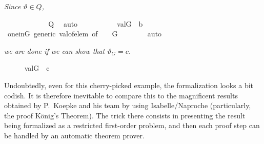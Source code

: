 \textit{Since
  $\vartheta \in Q$,}
\begin{isabelle}
\ \ \ \ \isamarkupfalse%
\isanewline
\ \ \ \ \isamarkupfalse%
\ {\isachardoublequoteopen}{\isacharquery}{\kern0pt}{\isasymtheta}\ {\isasymin}\ {\isacharquery}{\kern0pt}Q{\isachardoublequoteclose}\ \isamarkupfalse%
\ auto\isanewline
\ \ \ \ \isamarkupfalse%
\isanewline
\ \ \ \ \isamarkupfalse%
\ {\isachardoublequoteopen}val{\isacharparenleft}{\kern0pt}G{\isacharcomma}{\kern0pt}{\isacharquery}{\kern0pt}{\isasymtheta}{\isacharparenright}{\kern0pt}\ {\isasymin}\ {\isacharquery}{\kern0pt}b{\isachardoublequoteclose}\isanewline
\ \ \ \ \ \ \isamarkupfalse%
\ one{\isacharunderscore}{\kern0pt}in{\isacharunderscore}{\kern0pt}G\ generic\ val{\isacharunderscore}{\kern0pt}of{\isacharunderscore}{\kern0pt}elem\ {\isacharbrackleft}{\kern0pt}of\ {\isacharquery}{\kern0pt}{\isasymtheta}\ {\isasymone}\ {\isacharquery}{\kern0pt}{\isasympi}\ G{\isacharbrackright}{\kern0pt}\isanewline
\ \ \ \ \ \ \isamarkupfalse%
\ auto
\end{isabelle}
\textit{we are done if we can show that
  $\vartheta_{G}=c$.}
\begin{isabelle}
\ \ \ \ \isamarkupfalse%
\ {\isachardoublequoteopen}val{\isacharparenleft}{\kern0pt}G{\isacharcomma}{\kern0pt}{\isacharquery}{\kern0pt}{\isasymtheta}{\isacharparenright}{\kern0pt}\ {\isacharequal}{\kern0pt}\ c{\isachardoublequoteclose}
\end{isabelle}

Undoubtedly, even for this cherry-picked example, the formalization
looks a bit codish. It is therefore inevitable to compare this to the
magnificent results obtained by P.~Koepke and his team by using
Isabelle/Naproche \cite{10.1007/978-3-030-81097-9_2} (particularly,
the proof König's Theorem). The trick there consists in presenting the result
being formalized as a restricted first-order problem, and then each
proof step can be handled by an automatic theorem prover.

